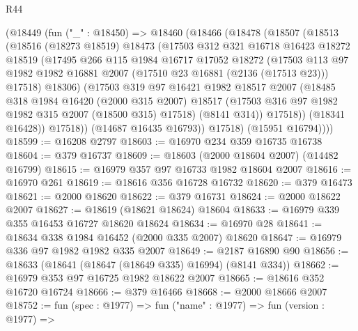 \begin{lexlean}{R44}
\begin{coremodule}
      (@18449
        (fun ("_" : @18450) =>
        @18460
          (@18466
            (@18478
              (@18507
                (@18513
                  (@18516
                    (@18273 @18519)
                    @18473
                    (@17503
                      @312
                      @321
                      @16718
                      @16423
                      @18272
                      @18519
                      (@17495
                        @266
                        @115
                        @1984
                        @16717
                        @17052
                        @18272
                        (@17503
                          @113
                          @97
                          @1982
                          @1982
                          @16881
                          @2007
                          (@17510 @23 @16881 (@2136 (@17513 @23)))
                          @17518)
                        @18306)
                      (@17503
                        @319
                        @97
                        @16421
                        @1982
                        @18517
                        @2007
                        (@18485
                          @318
                          @1984
                          @16420
                          (@2000 @315 @2007)
                          @18517
                          (@17503 @316 @97 @1982 @1982 @315 @2007 (@18500 @315) @17518)
                          (@8141 @314))
                        @17518))
                    (@18341 @16428))
                  @17518))
              (@14687 @16435 @16793))
            @17518)
          (@15951 @16794))))
@18599 := @16208 @2797
@18603 := @16970 @234 @359 @16735 @16738
@18604 := @379 @16737
@18609 := @18603 (@2000 @18604 @2007) (@14482 @16799)
@18615 := @16979 @357 @97 @16733 @1982 @18604 @2007
@18616 := @16970 @261
@18619 := @18616 @356 @16728 @16732
@18620 := @379 @16473
@18621 := @2000 @18620
@18622 := @379 @16731
@18624 := @2000 @18622 @2007
@18627 := @18619 (@18621 @18624) @18604
@18633 := @16979 @339 @355 @16453 @16727 @18620 @18624
@18634 := @16970 @28
@18641 := @18634 @338 @1984 @16452 (@2000 @335 @2007) @18620
@18647 := @16979 @336 @97 @1982 @1982 @335 @2007
@18649 := @2187 @16890 @90
@18656 := @18633 (@18641 (@18647 (@18649 @335) @16994) (@8141 @334))
@18662 := @16979 @353 @97 @16725 @1982 @18622 @2007
@18665 := @18616 @352 @16720 @16724
@18666 := @379 @16466
@18668 := @2000 @18666 @2007
@18752 := fun (spec : @1977) =>
  fun ("name" : @1977) =>
  fun (version : @1977) =>

\end{coremodule}
\end{lexlean}
